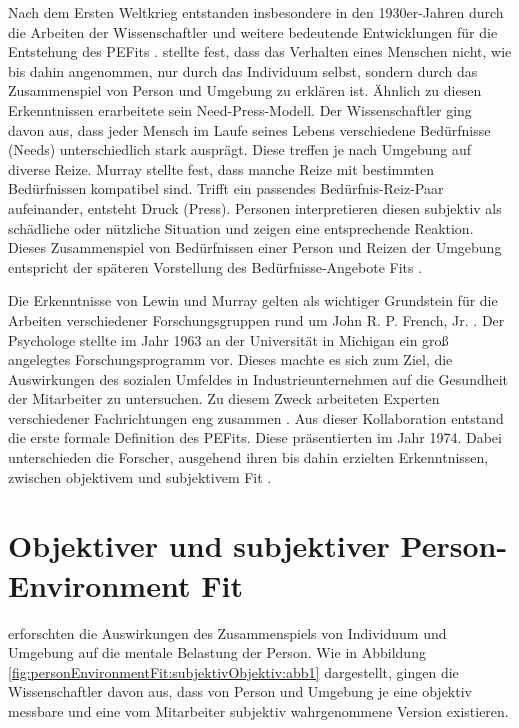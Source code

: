Nach dem Ersten Weltkrieg entstanden insbesondere in den 1930er-Jahren durch die Arbeiten der Wissenschaftler \textcite[S. 1ff]{lewin:1936} und \textcite[S. 1ff.]{murray:1938} weitere bedeutende Entwicklungen für die Entstehung des \acp{PEFit} \cite[S. 1]{edwards:1990}. \textcite[S. 11f.]{lewin:1936} stellte fest, dass das Verhalten eines Menschen nicht, wie bis dahin angenommen, nur durch das Individuum selbst, sondern durch das Zusammenspiel von Person und Umgebung zu erklären ist. Ähnlich zu diesen Erkenntnissen erarbeitete \textcite[S. 38ff.]{murray:1938} sein Need-Press-Modell. Der Wissenschaftler ging davon aus, dass jeder Mensch im Laufe seines Lebens verschiedene Bedürfnisse (Needs) unterschiedlich stark ausprägt. Diese treffen je nach Umgebung auf diverse Reize. Murray stellte fest, dass manche Reize mit bestimmten Bedürfnissen kompatibel sind. Trifft ein passendes Bedürfnis-Reiz-Paar aufeinander, entsteht Druck (Press). Personen interpretieren diesen subjektiv als schädliche oder nützliche Situation und zeigen eine entsprechende Reaktion. Dieses Zusammenspiel von Bedürfnissen einer Person und Reizen der Umgebung entspricht der späteren Vorstellung des Bedürfnisse-Angebote Fits \cite[S. 8]{edwards:2008}. 

Die Erkenntnisse von Lewin und Murray gelten als wichtiger Grundstein für die Arbeiten verschiedener Forschungsgruppen rund um John R. P. French, Jr. \cite[S. 5]{caplan:1993}. Der Psychologe stellte im Jahr 1963 an der Universität in Michigan ein groß angelegtes Forschungsprogramm vor. Dieses machte es sich zum Ziel, die Auswirkungen des sozialen Umfeldes in Industrieunternehmen auf die Gesundheit der Mitarbeiter zu untersuchen. Zu diesem Zweck arbeiteten Experten verschiedener Fachrichtungen eng zusammen \cite[S. 1ff.]{french:1963}. Aus dieser Kollaboration entstand die erste formale Definition des \acp{PEFit}. Diese präsentierten \textcite[S. 1ff.]{copingAndAdaption:1974} im Jahr 1974. Dabei unterschieden die Forscher, ausgehend ihren bis dahin erzielten Erkenntnissen, zwischen objektivem und subjektivem Fit \cite[S. 4f.]{caplan:1993}\cite[S. 1ff.]{french:1966}.

\section{Objektiver und subjektiver Person-Environment Fit}
\label{ch:personEnvironmentFit:subjektivObjektiv}
\textcite[S. 1ff.]{copingAndAdaption:1974} erforschten die Auswirkungen des Zusammenspiels von Individuum und Umgebung auf die mentale Belastung der Person. Wie in Abbildung \ref{fig:personEnvironmentFit:subjektivObjektiv:abb1} dargestellt, gingen die Wissenschaftler davon aus, dass von Person und Umgebung je eine objektiv messbare und eine vom Mitarbeiter subjektiv wahrgenommene Version existieren.

